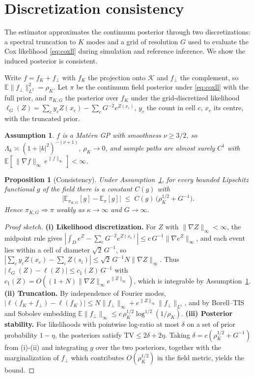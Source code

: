 \documentclass[10pt,twocolumn]{article}
\newtheorem{proposition}{Proposition}
\newtheorem{assumption}{Assumption}
\newcommand{\E}{\mathbb{E}}
\newcommand{\fperp}{f_{\perp}}
\begin{document}
\section{Discretization consistency}
\label{sec:theory}

The estimator approximates the continuum posterior through two discretizations: a
spectral truncation to $K$ modes and a grid of resolution $G$ used to evaluate the
Cox likelihood \eqref{eq:coxll} during simulation and reference inference. We show
the induced posterior is consistent.

Write $f=f_K+\fperp$ with $f_K$ the projection onto $\mathcal K$ and
$\fperp$ the complement, so $\E\|\fperp\|_{L^2}^2=\rho_K$. Let $\pi$ be the
continuum field posterior under \eqref{eq:coxll} with the full prior, and
$\pi_{K,G}$ the posterior over $f_K$ under the grid-discretized likelihood
$\ell_G(Z)=\sum_c y_c Z(x_c)-\sum_c G^{-2}e^{Z(x_c)}$, $y_c$ the count in cell $c$,
$x_c$ its centre, with the truncated prior.

\begin{assumption}\label{as:prior}
$f$ is a Mat\'ern GP with smoothness $\nu\ge 3/2$, so $\Lambda_k\asymp(1+|k|^2)^{-(\nu+1)}$,
$\rho_K\to0$, and sample paths are almost surely $C^1$ with
$\E[\,\|\nabla f\|_\infty\, e^{\|f\|_\infty}\,]<\infty$.
\end{assumption}

\begin{proposition}[Consistency]\label{prop:consistency}
Under Assumption~\ref{as:prior}, for every bounded Lipschitz functional $g$ of the
field there is a constant $C(g)$ with
\[
\bigl|\E_{\pi_{K,G}}[g]-\E_{\pi}[g]\bigr|\;\le\;C(g)\,\bigl(\rho_K^{1/2}+G^{-1}\bigr).
\]
Hence $\pi_{K,G}\Rightarrow\pi$ weakly as $\kappa\to\infty$ and $G\to\infty$.
\end{proposition}

\begin{proof}[Proof sketch]
\textbf{(i) Likelihood discretization.} For $Z$ with $\|\nabla Z\|_\infty<\infty$,
the midpoint rule gives
$|\int_D e^{Z}-\sum_c G^{-2}e^{Z(x_c)}|\le c\,G^{-1}\|\nabla e^{Z}\|_\infty$, and
each event lies within a cell of diameter $\sqrt2\,G^{-1}$, so
$|\sum_c y_c Z(x_c)-\sum_i Z(s_i)|\le\sqrt2\,G^{-1}N\|\nabla Z\|_\infty$. Thus
$|\ell_G(Z)-\ell(Z)|\le c_1(Z)\,G^{-1}$ with $c_1(Z)=O((1+N)\|\nabla Z\|_\infty e^{\|Z\|_\infty})$,
which is integrable by Assumption~\ref{as:prior}.
\textbf{(ii) Truncation.} By independence of Fourier modes,
$|\ell(f_K+\fperp)-\ell(f_K)|\le N\|\fperp\|_\infty+e^{\|Z\|_\infty}\|\fperp\|_{L^1}$,
and by Borell--TIS and Sobolev embedding
$\E\|\fperp\|_\infty\le c\,\rho_K^{1/2}\log^{1/2}(1/\rho_K)$.
\textbf{(iii) Posterior stability.} For likelihoods with pointwise log-ratio at
most $\delta$ on a set of prior probability $1-\eta$, the posteriors satisfy
$\mathrm{TV}\le 2\delta+2\eta$. Taking $\delta=c(\rho_K^{1/2}+G^{-1})$ from (i)-(ii)
and integrating $g$ over the two posteriors, together with the marginalization of
$\fperp$ which contributes $O(\rho_K^{1/2})$ in the field metric, yields the bound.
\end{proof}
\end{document}
